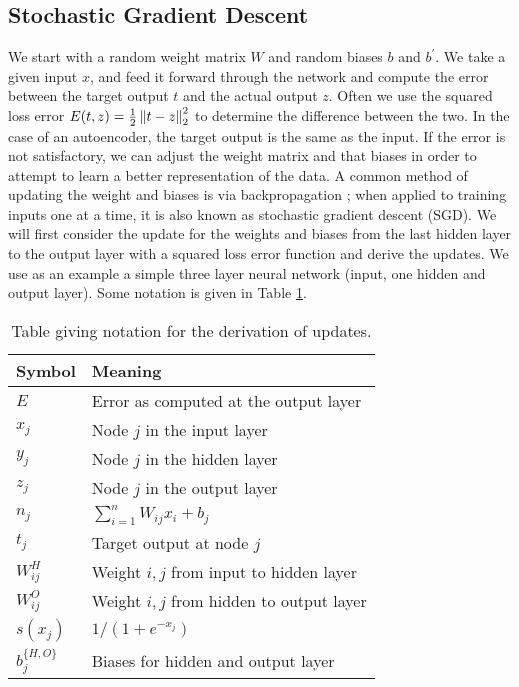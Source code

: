 \subsection{Stochastic Gradient Descent}

We start with a random weight matrix $W$ and random biases $b$ and $b^{'}$. We take a given input $x$, and feed it forward through the network and compute the error between the target output $t$ and the actual output $z$. Often we use the squared loss error $E(t,z) = \frac{1}{2}\left\lVert t-z \right\rVert_2^2$ to determine the difference between the two. In the case of an autoencoder, the target output is the same as the input. If the error is not satisfactory, we can adjust the weight matrix and that biases in order to attempt to learn a better representation of the data. A common method of updating the weight and biases is via backpropagation \cite{hecht1989theory}; when applied to training inputs one at a time, it is also known as stochastic gradient descent (SGD). We will first consider the update for the weights and biases from the last hidden layer to the output layer with a squared loss error function and derive the updates. We use as an example a simple three layer neural network (input, one hidden and output layer). Some notation is given in Table \ref{tab:notation}.

\begin{table}[h]
	\centering
\begin{tabular}{l|l}
Symbol     & Meaning                                                          \\ \hline
$E$          & Error as computed at the output layer                            \\
$x_j$       & Node $j$ in the input layer                                      \\
$y_j$       & Node $j$ in the hidden layer                                     \\
$z_j$       & Node $j$ in the output layer                                     \\
$n_j$       & $\sum_{i=1}^n W_{ij}x_i + b_j$                                   \\
$t_j$       & Target output at node $j$                                   \\
$W_{ij}^H$ & Weight $i,j$ from input to hidden layer \\
$W_{ij}^O$ & Weight $i,j$ from hidden to output layer \\
$s(x_j)$    & $1/(1+e^{-x_j})$                                                 \\
$b_j^{\{H,O\}}$    & Biases for hidden and output layer                                                \\
\end{tabular}
\caption{Table giving notation for the derivation of updates.}
\label{tab:notation}
\end{table}

